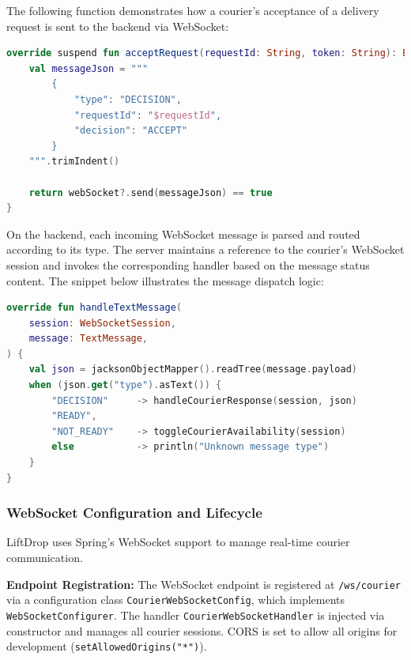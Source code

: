 The following function demonstrates how a courier's acceptance of a delivery request is sent to the backend via WebSocket:

\vspace{5.0mm}

\begin{lstlisting}[language=Kotlin, 
  basicstyle=\ttfamily\small, 
  lineskip=-0.1pt,
  caption={Sending an acceptance message via WebSocket}]
override suspend fun acceptRequest(requestId: String, token: String): Boolean {
    val messageJson = """
        {
            "type": "DECISION",
            "requestId": "$requestId",
            "decision": "ACCEPT"
        }
    """.trimIndent()

    return webSocket?.send(messageJson) == true
}
\end{lstlisting}

\vspace{5.0mm}

On the backend, each incoming WebSocket message is parsed and routed according to its type. The server maintains a reference to the courier’s WebSocket session and invokes the corresponding handler based on the message status content. The snippet below illustrates the message dispatch logic:

\vspace{5.0mm}

\begin{lstlisting}[language=Kotlin, caption={Backend handling of incoming WebSocket messages}]
override fun handleTextMessage(
    session: WebSocketSession,
    message: TextMessage,
) {
    val json = jacksonObjectMapper().readTree(message.payload)
    when (json.get("type").asText()) {
        "DECISION"     -> handleCourierResponse(session, json)
        "READY", 
        "NOT_READY"    -> toggleCourierAvailability(session)
        else           -> println("Unknown message type")
    }
}
\end{lstlisting}

\subsubsection{WebSocket Configuration and Lifecycle}

LiftDrop uses Spring’s WebSocket support to manage real-time courier communication.

\textbf{Endpoint Registration:}  
The WebSocket endpoint is registered at \texttt{/ws/courier} via a configuration class \texttt{CourierWebSocketConfig}, which implements \texttt{WebSocketConfigurer}. The handler \texttt{CourierWebSocketHandler} is injected via constructor and manages all courier sessions. CORS is set to allow all origins for development (\texttt{setAllowedOrigins("*")}).

